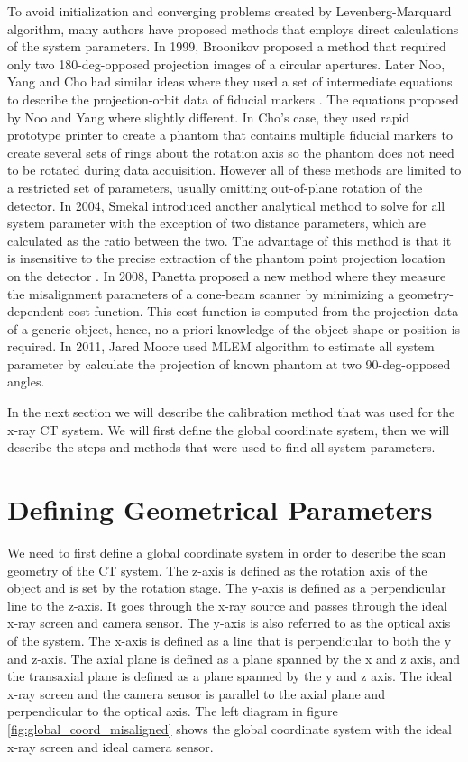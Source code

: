 To avoid initialization and converging problems created by Levenberg-Marquard algorithm, many authors have proposed methods that employs direct calculations of the system parameters.  In 1999, Broonikov proposed a method that required only two 180-deg-opposed projection images of a circular apertures.  Later Noo, Yang and Cho had similar ideas where they used a set of intermediate equations to describe the projection-orbit data of fiducial markers \cite{Noo2000} \cite{Yang2006} \cite{Cho2005}.  The equations proposed by Noo and Yang where slightly different.  In Cho's case, they used rapid prototype printer to create a phantom that contains multiple fiducial markers to create several sets of rings about the rotation axis so the phantom does not need to be rotated during data acquisition.  However all of these methods are limited to a restricted set of parameters, usually omitting out-of-plane rotation of the detector.  In 2004, Smekal introduced another analytical method to solve for all system parameter with the exception of two distance parameters, which are calculated as the ratio between the two.  The advantage of this method is that it is insensitive to the precise extraction of the phantom point projection location on the detector \cite{Smekal2004}.  In 2008, Panetta \citep{Panetta2008} proposed a new method where they measure the misalignment parameters of a cone-beam scanner by minimizing a geometry-dependent cost function.  This cost function is computed from the projection data of a generic object, hence, no a-priori knowledge of the object shape or position is required.  In 2011, Jared Moore used MLEM algorithm to estimate all system parameter by calculate the projection of known phantom at two 90-deg-opposed angles.


In the next section we will describe the calibration method that was used for the x-ray CT system.  We will first define the global coordinate system, then we will describe the steps and methods that were used to find all system parameters.

\section{Defining Geometrical Parameters}
We need to first define a global coordinate system in order to describe the scan geometry of the CT system.  The z-axis is defined as the rotation axis of the object and is set by the rotation stage.  The y-axis is defined as a perpendicular line to the z-axis.  It goes through the x-ray source and passes through the ideal x-ray screen and camera sensor.  The y-axis is also referred to as the optical axis of the system.  The x-axis is defined as a line that is perpendicular to both the y and z-axis.  The axial plane is defined as a plane spanned by the x and z axis, and the transaxial plane is defined as a plane spanned by the y and z axis.  The ideal x-ray screen and the camera sensor is parallel to the axial plane and perpendicular to the optical axis.  The left diagram in figure \ref{fig:global_coord_misaligned} shows the global coordinate system with the ideal x-ray screen and ideal camera sensor.  

